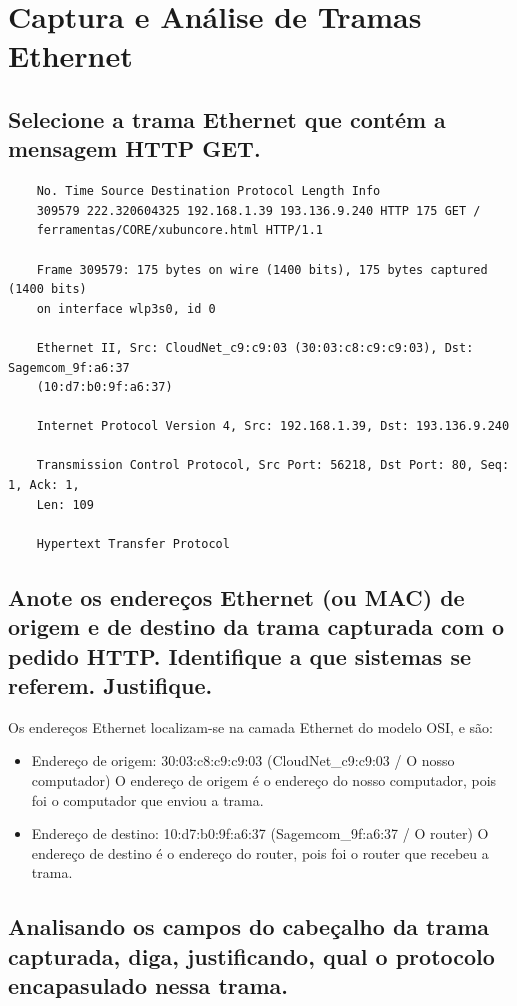 \section{Captura e Análise de Tramas Ethernet}
\subsection*{Selecione a trama Ethernet que contém a mensagem HTTP GET.}

\begin{verbatim}
    No. Time Source Destination Protocol Length Info
    309579 222.320604325 192.168.1.39 193.136.9.240 HTTP 175 GET /
    ferramentas/CORE/xubuncore.html HTTP/1.1

    Frame 309579: 175 bytes on wire (1400 bits), 175 bytes captured (1400 bits) 
    on interface wlp3s0, id 0

    Ethernet II, Src: CloudNet_c9:c9:03 (30:03:c8:c9:c9:03), Dst: Sagemcom_9f:a6:37
    (10:d7:b0:9f:a6:37)

    Internet Protocol Version 4, Src: 192.168.1.39, Dst: 193.136.9.240

    Transmission Control Protocol, Src Port: 56218, Dst Port: 80, Seq: 1, Ack: 1, 
    Len: 109

    Hypertext Transfer Protocol
\end{verbatim}

\subsection{Anote os endereços Ethernet (ou MAC) de origem e de destino da trama
capturada com o pedido HTTP. Identifique a que sistemas se referem. Justifique.}

Os endereços Ethernet localizam-se na camada Ethernet do modelo OSI, e são:
\begin{itemize}
    \item Endereço de origem: 30:03:c8:c9:c9:03 (CloudNet\_c9:c9:03 / O nosso computador) \linebreak
    O endereço de origem é o endereço do nosso computador, pois foi o computador que enviou a trama.
    \item Endereço de destino: 10:d7:b0:9f:a6:37 (Sagemcom\_9f:a6:37 / O router) \linebreak
    O endereço de destino é o endereço do router, pois foi o router que recebeu a trama.
\end{itemize}

\subsection{Analisando os campos do cabeçalho da trama capturada, diga, justificando, qual
o protocolo encapasulado nessa trama.}

